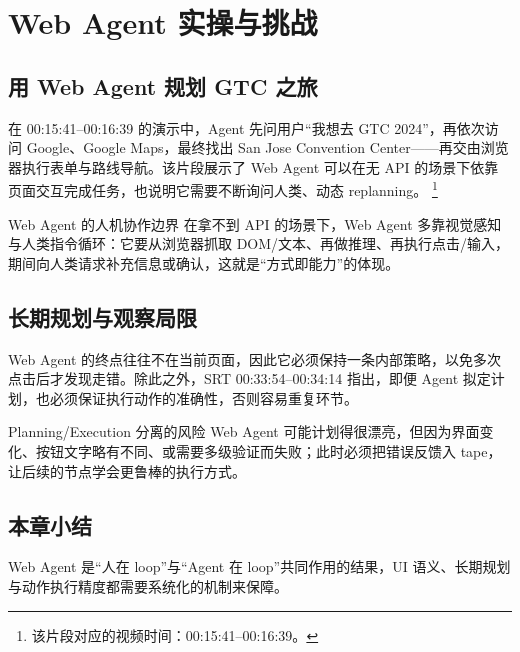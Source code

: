 \section{Web Agent 实操与挑战}
\subsection{用 Web Agent 规划 GTC 之旅}
在 00:15:41--00:16:39 的演示中，Agent 先问用户“我想去 GTC 2024”，再依次访问 Google、Google Maps，最终找出 San Jose Convention Center——再交由浏览器执行表单与路线导航。该片段展示了 Web Agent 可以在无 API 的场景下依靠页面交互完成任务，也说明它需要不断询问人类、动态 replanning。
\footnote{该片段对应的视频时间：00:15:41--00:16:39。}

\begin{importantbox}{Web Agent 的人机协作边界}
在拿不到 API 的场景下，Web Agent 多靠视觉感知与人类指令循环：它要从浏览器抓取 DOM/文本、再做推理、再执行点击/输入，期间向人类请求补充信息或确认，这就是“方式即能力”的体现。
\end{importantbox}

\subsection{长期规划与观察局限}
Web Agent 的终点往往不在当前页面，因此它必须保持一条内部策略，以免多次点击后才发现走错。除此之外，SRT 00:33:54--00:34:14 指出，即便 Agent 拟定计划，也必须保证执行动作的准确性，否则容易重复环节。

\begin{warningbox}{Planning/Execution 分离的风险}
Web Agent 可能计划得很漂亮，但因为界面变化、按钮文字略有不同、或需要多级验证而失败；此时必须把错误反馈入 tape，让后续的节点学会更鲁棒的执行方式。
\end{warningbox}

\subsection{本章小结}
Web Agent 是“人在 loop”与“Agent 在 loop”共同作用的结果，UI 语义、长期规划与动作执行精度都需要系统化的机制来保障。

